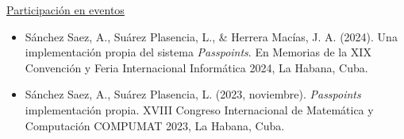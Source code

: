 \underline{Participaci\'on en eventos}
\begin{itemize}
	\item Sánchez Saez, A., Suárez Plasencia, L., \& Herrera Macías, J. A. (2024). Una implementación propia del sistema \textit{Passpoints}. En Memorias de la XIX Convención y Feria Internacional Informática 2024, La Habana, Cuba.
	
	\item Sánchez Saez, A., Suárez Plasencia, L. (2023, noviembre). \textit{Passpoints} implementaci\'on propia. XVIII Congreso Internacional de Matemática y Computación COMPUMAT 2023, La Habana, Cuba.
\end{itemize}
